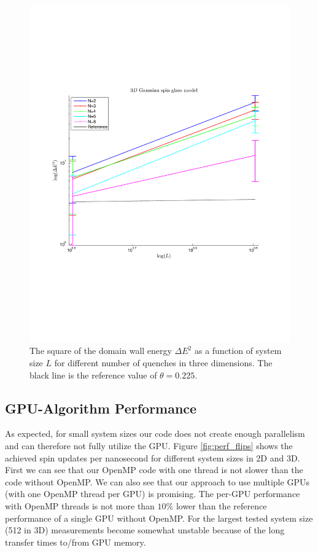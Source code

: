 \documentclass[paper=a4, fontsize=11pt]{scrartcl} %
\numberwithin{equation}{section} %
\numberwithin{figure}{section} %
\numberwithin{table}{section} %
\begin{document}
\begin{figure}
\centering
\includegraphics[width=\textwidth]{images/spinglass3D_small.pdf}
\caption{The square of the domain wall energy $\Delta E ^ 2$ as a function of system size $L$ for different number of quenches in three dimensions. The black line is the reference value of $\theta=0.225$.}
\label{fig:E_3D_small}
\end{figure}

\subsection{GPU-Algorithm Performance}
As expected, for small system sizes our code does not create enough parallelism and can therefore not fully utilize the GPU. Figure \ref{fig:perf_flips} shows the achieved spin updates per nanosecond for different system sizes in 2D and 3D. First we can see that our OpenMP code with one thread is not slower than the code without OpenMP. We can also see that our approach to use multiple GPUs (with one OpenMP thread per GPU) is promising. The per-GPU performance with OpenMP threads is not more than $10\%$ lower than the reference performance of a single GPU without OpenMP. For the largest tested system size (512 in 3D) measurements become somewhat unstable because of the long transfer times to/from GPU memory.
\end{document}
